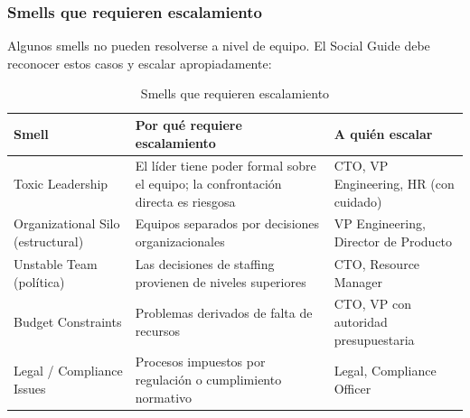 \FloatBarrier

\subsubsection{Smells que requieren escalamiento}

Algunos smells no pueden resolverse a nivel de equipo. El Social Guide debe reconocer estos casos y escalar apropiadamente:

\begin{table}[h]
    \centering
    \small
    \begin{tabularx}{\textwidth}{|l|X|X|}
        \hline
        \textbf{Smell} & \textbf{Por qué requiere escalamiento}                                            & \textbf{A quién escalar} \\
        \hline
        Toxic Leadership
                       & El líder tiene poder formal sobre el equipo; la confrontación directa es riesgosa
                       & CTO, VP Engineering, HR (con cuidado)                                                                        \\
        \hline
        Organizational Silo (estructural)
                       & Equipos separados por decisiones organizacionales
                       & VP Engineering, Director de Producto                                                                         \\
        \hline
        Unstable Team (política)
                       & Las decisiones de staffing provienen de niveles superiores
                       & CTO, Resource Manager                                                                                        \\
        \hline
        Budget Constraints
                       & Problemas derivados de falta de recursos
                       & CTO, VP con autoridad presupuestaria                                                                         \\
        \hline
        Legal / Compliance Issues
                       & Procesos impuestos por regulación o cumplimiento normativo
                       & Legal, Compliance Officer                                                                                    \\
        \hline
    \end{tabularx}
    \caption{Smells que requieren escalamiento}
    \label{tab:smells-escalamiento}
\end{table}
\FloatBarrier

